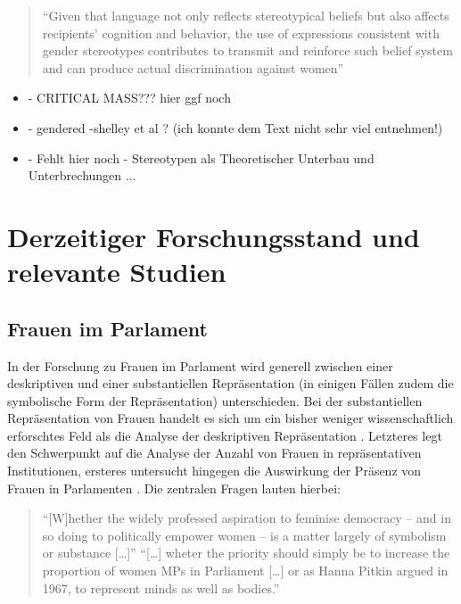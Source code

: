 \documentclass[12pt, 
    twoside=false, 
    bibliography=totoc, 
    numbers=endperiod, 
    headings=normal, 
    toc=chapterentrydotfill
    ]{scrbook}
\begin{document}
\begin{quote}
    \enquote{Given that language not only reflects stereotypical beliefs but also affects recipients’ cognition and behavior, the use of expressions consistent with gender stereotypes contributes to transmit and reinforce such belief system and can produce actual discrimination against women} \parencite[2]{menegatti_2017}
\end{quote}

\begin{itemize}
\item - CRITICAL MASS???  hier ggf noch 
\item - gendered -shelley et al ? (ich konnte dem Text nicht sehr viel entnehmen!) 
\item - Fehlt hier noch - Stereotypen als Theoretischer Unterbau und Unterbrechungen ...
\end{itemize}



\section {Derzeitiger Forschungsstand und relevante Studien }

\subsection{Frauen im Parlament}

In der Forschung zu Frauen im Parlament wird generell zwischen einer deskriptiven und einer substantiellen Repräsentation (in einigen Fällen zudem die symbolische Form der Repräsentation) unterschieden. Bei der substantiellen Repräsentation von Frauen handelt es sich um ein bisher weniger wissenschaftlich erforschtes Feld als die Analyse der deskriptiven Repräsentation \parencite[59]{wangnerud_2009}. 
Letzteres legt den Schwerpunkt auf die Analyse der Anzahl von Frauen in repräsentativen Institutionen, ersteres untersucht hingegen die Auswirkung der Präsenz von Frauen in Parlamenten \parencites[14]{coffe_2013}[52]{wangnerud_2009}.
Die zentralen Fragen lauten hierbei:

\begin{quote}
  \enquote{[W]hether the widely professed aspiration to feminise democracy -- and in so doing to politically empower women -- is a matter largely of symbolism or substance […]}
  \enquote{[…] wheter the priority should simply be to increase the proportion of women MPs in Parliament […] or as Hanna Pitkin argued in 1967, to represent minds as well as bodies.}
  \parencite[413]{blaxill_2016}
\end{quote}
\end{document}
